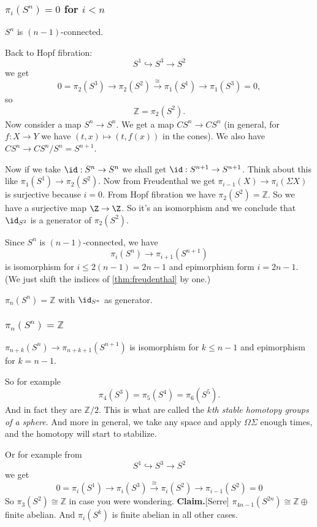 \subsubsection{\texorpdfstring{$\pi_{i}(S^{n})=0$}{πᵢ(Sⁿ)} for \texorpdfstring{$i<n$}{i<n}}

\begin{lemma}
	$S^n$ is $(n-1)$-connected.
\end{lemma}
Back to Hopf fibration:
$$S^1\hookrightarrow S^3\to S^2$$
we get
$$0=\pi_2(S^3)\to\pi_2(S^2)\overset{\cong}{\to}\pi_1(S^1)\to\pi_1(S^3)=0,$$
so
$$\mathbb{Z}=\pi_2(S^2).$$
Now consider a map $S^n\to S^n$. We get a map $CS^n\to CS^n$ (in general, for $f:X\to Y$ we have $(t,x)\mapsto(t,f(x))$ in the cones). We also have $CS^n\to CS^n/S^n=S^{n+1}$.

Now if we take $\id:S^n\to S^n$ we shall get $\id:S^{n+1}\to S^{n+1}$. Think about this like $\pi_1(S^1)\to\pi_2(S^2)$. Now from Freudenthal we get $\pi_{i-1}(X)\to\pi_i(\Sigma X)$ is surjective because $i=0$. From Hopf fibration we have $\pi_2(S^2)=\mathbb{Z}$. So we have a surjective map $\Z\to\Z$. So it's an isomorphism and we conclude that $\id_{S^2}$ is a generator of $\pi_2(S^2)$.
\begin{lemma}
	Since $S^n$ is $(n-1)$-connected, we have
	$$\pi_i(S^n)\to\pi_{i+1}(S^{n+1})$$
	is isomorphism for $i\leq 2(n-1)=2n-1$ and epimorphism form $i=2n-1$. (We just shift the indices of \cref{thm:freudenthal} by one.)
\end{lemma}
\begin{lemma}
	$\pi_n(S^n)=\mathbb{Z}$ with $\id_{S^n}$ as generator.
\end{lemma}

\subsubsection{$\pi_{n}(S^{n})=\mathbb{Z}$}
\begin{lemma}
	$\pi_{n+k}(S^n)\to\pi_{n+k+1}(S^{n+1})$ is isomorphism for $k\leq n-1$ and epimorphism for $k=n-1$.
\end{lemma}
So for example
$$\pi_4(S^3)=\pi_5(S^4)=\pi_6(S^5).$$
And in fact they are $\mathbb{Z}/2$. This is what are called the {\it $k$th stable homotopy groups of a sphere}. And more in general, we take any space and apply $\Omega\Sigma$ enough times, and the homotopy will start to stabilize.

Or for example from
$$S^1\hookrightarrow S^3\to S^2$$
we get
$$0=\pi_i(S^1)\to \pi_i(S^3)\overset{\cong}{\to}\pi_i(S^2)\to\pi_{i-1}(S^2)=0$$
So $\pi_3(S^2)\cong\mathbb{Z}$ in case you were wondering.
{\bf Claim.}[Serre]
	$\pi_{4n-1}(S^{2n})\cong\mathbb{Z}\oplus$finite abelian. And $\pi_i(S^k)$ is finite abelian in all other cases. 


